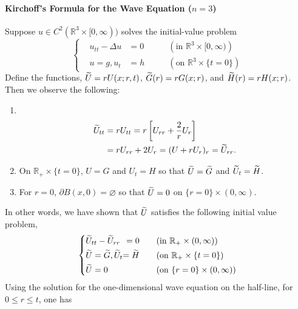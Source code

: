\documentclass{article}
\begin{document}
\paragraph{Kirchoff's Formula for the Wave Equation \texorpdfstring{($n = 3$)}{n =3}}
Suppose $u \in C^{2}(\mathbb{R}^{3} \times [0,\infty))$ solves the initial-value problem 
\begin{equation}
	\left\{
	\begin{alignedat}{3}
		&u_{tt} - \Delta u &= 0 &\qquad (\text{in $\mathbb{R}^{3} \times [0,\infty)$}) \\
		&u = g, u_{t} &=h &\qquad (\text{on $\mathbb{R}^{3} \times \{t = 0\}$})
	\end{alignedat}
	\right.
\end{equation}
Define the functions, $\widetilde{U} = rU(x;r, t)$, $\widetilde{G}(r) = rG(x;r)$, and $\widetilde{H}(r) = rH(x;r)$. Then we observe the following: 
\begin{enumerate}[itemsep =-2pt, label = (\roman{*})]
	\item $ $\newline \vspace{-0.75cm}
	\begin{align*}
		\begin{split}
			\widetilde{U}_{tt} &= rU_{tt} = r\left[U_{rr} + \frac{2}{r}U_{r}\right] \\
			&= rU_{rr} + 2U_{r} = (U + rU_{r})_{r} = \widetilde{U}_{rr}. 
		\end{split}
	\end{align*}
	\item On $\mathbb{R}_{+} \times \{t = 0\}$, $U = G$ and $U_{t} = H$ so that $\widetilde{U} =\widetilde{G}$ and $\widetilde{U}_{t} = \widetilde{H}$. 
	\item For $r = 0$, $\partial B(x, 0) = \varnothing$ so that $\widetilde{U} = 0$ on $\{r = 0\} \times (0, \infty)$. 
\end{enumerate}
In other words, we have shown that $\widetilde{U}$ satisfies the following initial value problem, 
\begin{equation*}
	\left\{
	\begin{alignedat}{3}
		&\widetilde{U}_{tt} - \widetilde{U}_{rr} &= 0 &\qquad (\text{in $\mathbb{R}_{+} \times (0,\infty)$}) \\
		&\widetilde{U} = \widetilde{G}, \widetilde{U}_{t} &= \widetilde{H} &\qquad (\text{on $\mathbb{R}_{+} \times \{t = 0\}$}) \\
		&\widetilde{U} = 0 &&\qquad (\text{on $\{r = 0\} \times (0,\infty)$})
	\end{alignedat}
	\right.
\end{equation*}
Using the solution for the one-dimensional wave equation on the half-line, for $0 \leq r \leq t$, one has 
\end{document}
